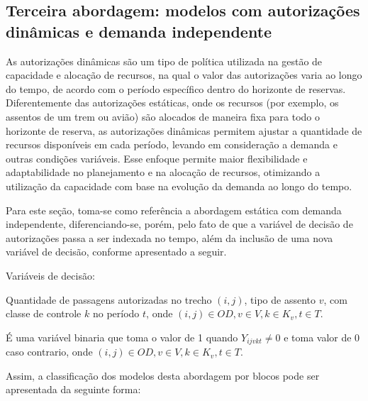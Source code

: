 \subsection{Terceira abordagem: modelos com autorizações dinâmicas e demanda independente}

As autorizações dinâmicas são um tipo de política utilizada na gestão de capacidade e alocação de recursos, na qual o valor das autorizações varia ao longo do tempo, de acordo com o período específico dentro do horizonte de reservas. Diferentemente das autorizações estáticas, onde os recursos (por exemplo, os assentos de um trem ou avião) são alocados de maneira fixa para todo o horizonte de reserva, as autorizações dinâmicas permitem ajustar a quantidade de recursos disponíveis em cada período, levando em consideração a demanda e outras condições variáveis. Esse enfoque permite maior flexibilidade e adaptabilidade no planejamento e na alocação de recursos, otimizando a utilização da capacidade com base na evolução da demanda ao longo do tempo.


Para este seção, toma-se como referência a abordagem estática com demanda independente, diferenciando-se, porém, pelo fato de que a variável de decisão de autorizações passa a ser indexada no tempo, além da inclusão de uma nova variável de decisão, conforme apresentado a seguir.

Variáveis de decisão:
\begin{description}[style=unboxed, leftmargin=2.5cm, labelindent=1.5cm]
	\setlength{\itemsep}{-2.2em} %
	\setlength{\parskip}{0em} %
	\item[$Y_{ijvkt}:$] Quantidade de passagens autorizadas no trecho $(i,j)$, tipo de assento $v$, com classe de controle $k$ no período $t$, onde $(i,j) \in OD, v \in V, k \in K_v, t \in T$.\\
	\item[$\gamma_{ijvkt}:$] É uma variável binaria que toma o valor de 1 quando $Y_{ijvkt} \neq 0$ e toma  valor de 0 caso contrario, onde $(i,j) \in OD, v \in V, k \in K_v, t \in T$.
\end{description}

Assim, a classificação dos modelos desta abordagem por blocos pode ser apresentada da seguinte forma:

